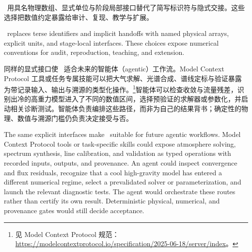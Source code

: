 \paynezero\ 用具名物理数组、显式单位与阶段局部接口替代了简写标识符与隐式交接。这些选择把数值约定暴露给审计、复现、教学与扩展。

\begin{EN}
\paynezero\ replaces terse identifiers and implicit handoffs with named physical
arrays, explicit units, and stage-local interfaces. These choices expose
numerical conventions for audit, reproduction, teaching, and extension.
\end{EN}

同样的显式接口使 \paynezero\ 适合未来的智能体（agentic）工作流。Model Context Protocol 工具或任务专属技能可以把大气求解、光谱合成、谱线定标与验证暴露为带记录输入、输出与溯源的类型化操作。\footnote{见 Model Context Protocol 规范：\url{https://modelcontextprotocol.io/specification/2025-06-18/server/index}。}智能体可以检查收敛与流量残差，识别出冷的高重力模型进入了不同的数值区间，选择预验证的求解器或参数化，并启动相关诊断测试。智能体负责编排这些路径，而非为自己的结果背书；确定性的物理、数值与溯源门槛仍负责决定接受与否。

\begin{EN}
The same explicit interfaces make \paynezero\ suitable for future agentic
workflows. Model Context Protocol tools or task-specific skills could expose
atmosphere solving, spectrum synthesis, line calibration, and validation as
typed operations with recorded inputs, outputs, and provenance.
An agent could
inspect convergence and flux residuals, recognize that a cool high-gravity
model has entered a different numerical regime, select a prevalidated solver or
parameterization, and launch the relevant diagnostic tests. The agent would
orchestrate these routes rather than certify its own result. Deterministic
physical, numerical, and provenance gates would still decide acceptance.
\end{EN}


